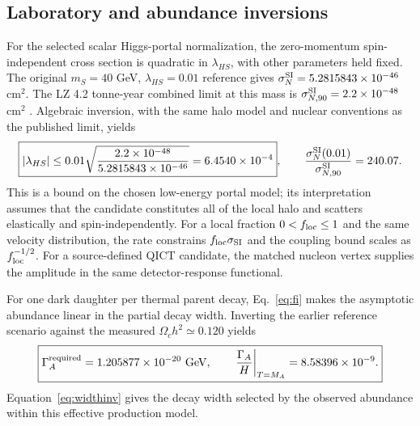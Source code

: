 \subsection{Laboratory and abundance inversions}

For the selected scalar Higgs-portal normalization, the zero-momentum spin-independent cross section is quadratic in $\lambda_{HS}$, with other parameters held fixed. The original $m_S=40$ GeV, $\lambda_{HS}=0.01$ reference gives $\sigma^{\rm SI}_N=5.2815843\times10^{-46}$ cm$^2$. The LZ 4.2 tonne-year combined limit at this mass is $\sigma^{\rm SI}_{N,90}=2.2\times10^{-48}$ cm$^2$ \cite{LZ25}. Algebraic inversion, with the same halo model and nuclear conventions as the published limit, yields
\begin{equation}\label{eq:portalbound}
\boxed{|\lambda_{HS}|\leq 0.01\sqrt{\frac{2.2\times10^{-48}}{5.2815843\times10^{-46}}}=6.4540\times10^{-4}},\qquad
\frac{\sigma_N^{\rm SI}(0.01)}{\sigma_{N,90}^{\rm SI}}=240.07.
\end{equation}
This is a bound on the chosen low-energy portal model; its interpretation assumes that the candidate constitutes all of the local halo and scatters elastically and spin-independently. For a local fraction $0<f_{\rm loc}\leq1$ and the same velocity distribution, the rate constrains $f_{\rm loc}\sigma_{\rm SI}$ and the coupling bound scales as $f_{\rm loc}^{-1/2}$.  For a source-defined QICT candidate, the matched nucleon vertex supplies the amplitude in the same detector-response functional.

For one dark daughter per thermal parent decay, Eq.~\eqref{eq:fi} makes the asymptotic abundance linear in the partial decay width. Inverting the earlier reference scenario against the measured $\Omega_ch^2\simeq0.120$ \cite{Planck} yields
\begin{equation}\label{eq:widthinv}
\boxed{\Gamma_A^{\rm required}=1.205877\times10^{-20}\ \mathrm{GeV},\qquad
\left.\frac{\Gamma_A}{H}\right|_{T=M_A}=8.58396\times10^{-9}.}
\end{equation}
Equation~\eqref{eq:widthinv} gives the decay width selected by the observed abundance within this effective production model.

